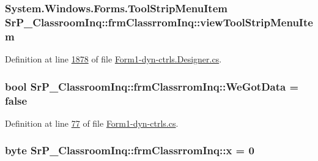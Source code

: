 \hypertarget{class_sr_p___classroom_inq_1_1frm_classrrom_inq_a703cf9f48d3d8aa2b88e8d9490600c54}{
\subsubsection[{view\-Tool\-Strip\-Menu\-Item}]{\setlength{\rightskip}{0pt plus 5cm}\-System.\-Windows.\-Forms.\-Tool\-Strip\-Menu\-Item {\bf \-Sr\-P\-\_\-\-Classroom\-Inq\-::frm\-Classrrom\-Inq\-::view\-Tool\-Strip\-Menu\-Item}}}
\label{class_sr_p___classroom_inq_1_1frm_classrrom_inq_a703cf9f48d3d8aa2b88e8d9490600c54}


\-Definition at line \hyperlink{_form1-dyn-ctrls_8_designer_8cs_source_l01878}{1878} of file \hyperlink{_form1-dyn-ctrls_8_designer_8cs_source}{\-Form1-\/dyn-\/ctrls.\-Designer.\-cs}.

\hypertarget{class_sr_p___classroom_inq_1_1frm_classrrom_inq_a44eb31e84ef4705e39c15c4d6047807e}{
\subsubsection[{\-We\-Got\-Data}]{\setlength{\rightskip}{0pt plus 5cm}bool {\bf \-Sr\-P\-\_\-\-Classroom\-Inq\-::frm\-Classrrom\-Inq\-::\-We\-Got\-Data} = false}}
\label{class_sr_p___classroom_inq_1_1frm_classrrom_inq_a44eb31e84ef4705e39c15c4d6047807e}


\-Definition at line \hyperlink{_form1-dyn-ctrls_8cs_source_l00077}{77} of file \hyperlink{_form1-dyn-ctrls_8cs_source}{\-Form1-\/dyn-\/ctrls.\-cs}.

\hypertarget{class_sr_p___classroom_inq_1_1frm_classrrom_inq_ab6836b7a465c2251301a02d9da5c3c31}{
\subsubsection[{x}]{\setlength{\rightskip}{0pt plus 5cm}byte {\bf \-Sr\-P\-\_\-\-Classroom\-Inq\-::frm\-Classrrom\-Inq\-::x} = 0}}
\label{class_sr_p___classroom_inq_1_1frm_classrrom_inq_ab6836b7a465c2251301a02d9da5c3c31}


